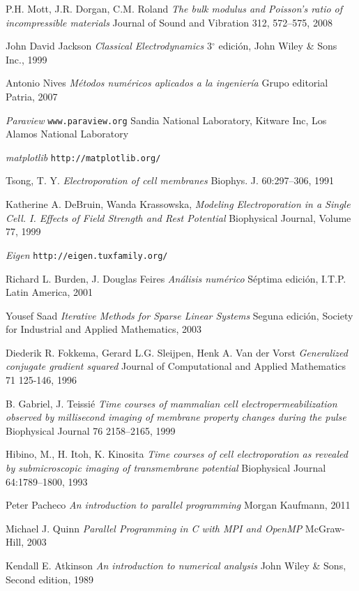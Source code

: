 \begin{thebibliography}{99}
	P.H. Mott, J.R. Dorgan, C.M. Roland 
	\emph{The bulk modulus and Poisson's ratio of incompressible materials} 
	Journal of Sound and Vibration 312, 572–575, 2008
	
	John David Jackson
	\emph{Classical Electrodynamics}
	3$^{\circ}$ edición,
	John Wiley \& Sons Inc.,
	1999

	Antonio Nives
	\emph{Métodos numéricos aplicados a la ingeniería}
	Grupo editorial Patria,
	2007

	\emph{Paraview}
	\texttt{www.paraview.org}
	Sandia National Laboratory, Kitware Inc, Los Alamos National Laboratory

	\emph{matplotlib}
	\texttt{http://matplotlib.org/}

	Tsong, T. Y.
	\emph{Electroporation of cell membranes}
	Biophys. J. 60:297–306, 1991

	Katherine A. DeBruin, Wanda Krassowska, 
	\emph{Modeling Electroporation in a Single Cell. I. Effects of Field Strength and
Rest Potential}
	Biophysical Journal, Volume 77, 1999
	
	\emph{Eigen}
	\texttt{http://eigen.tuxfamily.org/}
	
	Richard L. Burden, J. Douglas Feires
	\emph{Análisis numérico}
	Séptima edición, I.T.P. Latin America, 2001

	Yousef Saad
	\emph{Iterative Methods for Sparse Linear Systems}
	Seguna edición, Society for Industrial and Applied Mathematics, 2003

    Diederik R. Fokkema, Gerard L.G. Sleijpen, Henk A. Van der Vorst
    \emph{Generalized conjugate gradient squared}
    Journal of Computational and Applied Mathematics 71 125-146, 1996

    B. Gabriel, J. Teissié
    \emph{Time courses of mammalian cell electropermeabilization observed by millisecond imaging of membrane property changes during the pulse}
    Biophysical Journal 76 2158–2165, 1999

    Hibino, M., H. Itoh, K. Kinosita
    \emph{Time courses of cell electroporation as revealed by submicroscopic imaging of transmembrane potential}
    Biophysical Journal 64:1789–1800, 1993

	Peter Pacheco
	\emph{An introduction to parallel programming}
	Morgan Kaufmann, 2011

	Michael J. Quinn
	\emph{Parallel Programming in C with MPI and OpenMP}
	McGraw-Hill, 2003
	
	Kendall E. Atkinson
	\emph{An introduction to numerical analysis}
	John Wiley \& Sons,
	Second edition, 1989	

\end{thebibliography}
